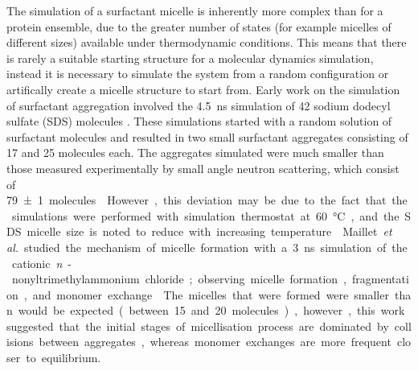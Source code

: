 The simulation of a surfactant micelle is inherently more complex than for a protein ensemble, due to the greater number of states (for example micelles of different sizes) available under thermodynamic conditions.
This means that there is rarely a suitable starting structure for a molecular dynamics simulation, instead it is necessary to simulate the system from a random configuration or artifically create a micelle structure to start from.
Early work on the simulation of surfactant aggregation involved the \SI{4.5}{\nano\second} simulation of 42 sodium dodecyl sulfate (SDS) molecules \cite{tarek_molecular_1998}.
These simulations started with a random solution of surfactant molecules and resulted in two small surfactant aggregates consisting of 17 and 25 molecules each.
The aggregates simulated were much smaller than those measured experimentally by small angle neutron scattering, which consist of \SI{79\pm1} molecules \cite{hassan_small_2003}.
However, this deviation may be due to the fact that the simulations were performed with simulation thermostat at \SI{60}{\celsius}, and the SDS micelle size is noted to reduce with increasing temperature \cite{hayashi_micelle_1980}.
Maillet \emph{et al.} studied the mechanism of micelle formation with a \SI{3}{\nano\second} simulation of the cationic \emph{n}-nonyltrimethylammonium chloride; observing micelle formation, fragmentation, and monomer exchange \cite{maillet_large_1999}.
The micelles that were formed were smaller than would be expected (between 15 and 20 molecules), however, this work suggested that the initial stages of micellisation process are dominated by collisions between aggregates, whereas monomer exchanges are more frequent closer to equilibrium.

